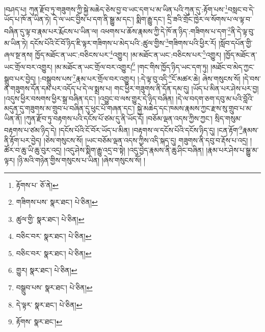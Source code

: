 །བཤད་པ། ཀུན་རྫོབ་ཏུ་གཟུགས་ཀྱི་སྐྱེ་མཆེད་ཅེས་བྱ་བ་ཡང་དག་པ་མ་ཡིན་པའི་ཀུན་དུ་:རྟོག་པས་\footnote{རྟོགས་པ་  ཅོ་ནེ། }བསླང་བ་དེ་ཡོད་པ་ཁོ་ན་ཡིན་ཏེ། དེ་ལ་ཡང་བྱིས་པ་དག་ནི་སྒྱུ་མ་དང་། སྨིག་རྒྱུ་དང་། དྲི་ཟའི་གྲོང་ཁྱེར་ལ་སོགས་པ་ལ་ལྟ་བ་བཞིན་དུ་ལྟ་བ་རྣམ་པར་རྨོངས་པ་ཡིན་ལ། འཕགས་པ་ཆོས་རྣམས་ཀྱི་དེ་ཁོ་ན་ཉིད་:གཟིགས་པ་དག་\footnote{གཟིགས་པས་  སྣར་ཐང་།  པེ་ཅིན། }ནི་དེ་ལྟ་བུ་མ་ཡིན་ཏེ། དངོས་པོའི་ངོ་བོ་ཉིད་ཇི་ལྟར་གཟིགས་པ་མེད་པའི་:ཚུལ་གྱིས་\footnote{ཚུལ་གྱི་  སྣར་ཐང་།  པེ་ཅིན། }གཟིགས་པའི་ཕྱིར་རོ། །སློབ་དཔོན་གྱི་ཞལ་སྔ་ནས། ཁྱོད་མཐོང་ན་ཡང་:བཅིངས་པར་\footnote{བཅིང་བར་  སྣར་ཐང་།  པེ་ཅིན། }འགྱུར། །མ་མཐོང་ན་ཡང་:བཅིངས་པར་\footnote{བཅིང་བར་  སྣར་ཐང་།  པེ་ཅིན། }འགྱུར། །ཁྱོད་མཐོང་ན་ཡང་གྲོལ་བར་འགྱུར། །མ་མཐོང་ན་ཡང་གྲོལ་བར་འགྱུར།\footnote{གྱུར།  སྣར་ཐང་།  པེ་ཅིན། } །གང་གིས་ཁྱོད་ཉིད་ཡང་དག་ཏུ། །མཐོང་བ་མེད་ཀྱང་སྒྲུབ་པར་བྱེད། །:བསྒྲུབས་པས་\footnote{བསྒྲུབ་པས་  སྣར་ཐང་།  པེ་ཅིན། }རྣམ་པར་གྲོལ་བར་འགྱུར། །:དེ་ལྟ་བུ་འདི་\footnote{དེ་ལྟར་  སྣར་ཐང་།  པེ་ཅིན། }ངོ་མཚར་ཆེ། ཞེས་གསུངས་སོ། །དེ་བས་ན་གཟུགས་དོན་དམ་པར་འདོད་པ་དེ་ལ་སྨྲས་པ། གང་ཕྱིར་གཟུགས་ནི་དོན་དམ་དུ། །ཡོད་པ་མིན་པར་ཤེས་པར་བྱ། །འདུས་ཕྱིར་བསགས་ཕྱིར་སྒྲ་བཞིན་དང་། །འབྱུང་བ་ལས་གྱུར་དེ་ཉིད་བཞིན། །དེ་ལ་བདག་ཅག་དབུ་མ་པའི་བློའི་མདུན་དུ་གཟུགས་མ་གྲུབ་པ་བཞིན་དུ་ཕུང་པོ་གཞན་དང་། སྐྱེ་མཆེད་དང་ཁམས་རྣམས་ཀྱང་རྫས་སུ་གྲུབ་པ་མ་ཡིན་ནོ། །ཀུན་རྫོབ་ཏུ་བརྟགས་པའི་དངོས་པོ་ཙམ་དུ་ནི་ཡོད་དོ། །བཅོམ་ལྡན་འདས་ཀྱིས་ཀྱང་། སྲིད་གསུམ་བརྟགས་པ་ཙམ་ཉིད་དེ། །དངོས་པོའི་ངོ་བོར་ཡོད་པ་མིན། །བརྟགས་ལ་དངོས་པོའི་དངོས་ཉིད་དུ། །ངན་རྟོག་\footnote{རྟོགས་  སྣར་ཐང་། }རྣམས་ནི་རྟོག་པར་བྱེད། །ཅེས་གསུངས་སོ། །ཡང་བཅོམ་ལྡན་འདས་ཀྱིས་འདི་སྐད་དུ། གཟུགས་ནི་དབུ་བ་རྡོས་པ་འདྲ། །ཚོར་བ་ཆུ་ཡི་ཆུ་བུར་འདྲ། །འདུ་ཤེས་སྨིག་རྒྱུ་འདྲ་བ་སྟེ། །འདུ་བྱེད་རྣམས་ནི་ཆུ་ཤིང་བཞིན། །རྣམ་པར་ཤེས་པ་སྒྱུ་མ་ལྟར། །ཉི་མའི་གཉེན་གྱིས་གསུངས་པ་ཡིན། །ཞེས་གསུངས་སོ། །

